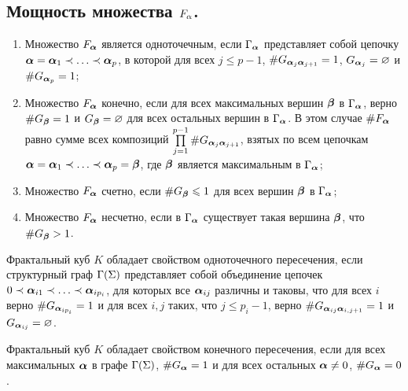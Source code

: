 \subsection{Мощность множества $F_\alpha$.}

\begin{theorem}\qquad
\begin{enumerate}[nolistsep]
\item Множество $F_{\bm{\alpha}}$ является одноточечным, если $\Gamma_{\bm{\alpha}}$ представляет собой цепочку ${\bm{\alpha}}={\bm{\alpha}}_1\prec\ldots\prec{\bm{\alpha}}_p$, в которой для всех $j\le p-1$, $\# G_{{\bm{\alpha}}_j{\bm{\alpha}}_{j+1}}=1$, $G_{{\bm{\alpha}}_j}=\varnothing$ и $\#G_{{\bm{\alpha}}_p}=1$;
\item Множество $F_{\bm{\alpha}}$ конечно, если для всех максимальных вершин ${\bm{\beta}}$ в $\Gamma_{\bm{\alpha}}$, верно $\#G_{\bm{\beta}}=1$ и $G_{{\bm{\beta}}}=\varnothing$ для всех остальных вершин в $\Gamma_{\bm{\alpha}}$.
В этом случае $\#F_{\bm{\alpha}}$ равно сумме всех композиций $\prod \limits_{j=1}^{p-1}\# G_{{\bm{\alpha}}_j{\bm{\alpha}}_{j+1}}$, взятых по всем цепочкам ${\bm{\alpha}}={\bm{\alpha}}_1\prec\ldots\prec{\bm{\alpha}}_p={\bm{\beta}}$, где ${\bm{\beta}}$ является максимальным в $\Gamma_{\bm{\alpha}}$;
\item Множество $F_{\bm{\alpha}}$ счетно, если $\#G_{\bm{\beta}}\leqslant 1$ для всех вершин ${\bm{\beta}}$ в $\Gamma_{\bm{\alpha}}$;
\item Множество $F_{\bm{\alpha}}$ несчетно, если в $\Gamma_{\bm{\alpha}}$ существует такая вершина ${\bm{\beta}}$, что $\#G_{\bm{\beta}}> 1$.
\end{enumerate}
\end{theorem}

\begin{corollary}
Фрактальный куб $K$ обладает свойством одноточечного пересечения, если структурный граф $\Gamma(\Sigma)$ представляет собой объединение цепочек $0\prec{\bm{\alpha}}_{i1}\prec\ldots\prec{\bm{\alpha}}_{ip_i}$, для которых все ${\bm{\alpha}}_{ij}$ различны и таковы, что для всех $i$ верно $\#G_{{\bm{\alpha}}_{ip_i}}=1$ и для всех $i,j$ таких, что $j\le p_i-1$, верно $\# G_{{\bm{\alpha}}_{ij}{\bm{\alpha}}_{i,j+1}}=1$ и $G_{{\bm{\alpha}}_{ij}}=\varnothing$.

Фрактальный куб $K$ обладает свойством конечного пересечения, если для всех максимальных ${\bm{\alpha}}$ в графе $\Gamma (\Sigma)$, $\#G_{\bm{\alpha}}=1$ и для всех остальных ${\bm{\alpha}}\neq 0$, $\#G_{\bm{\alpha}}=0$.
\end{corollary}

